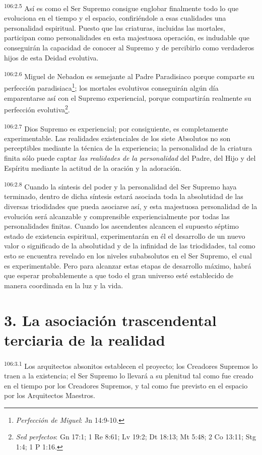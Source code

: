 \documentclass[twoside, 11pt]{book}
\begin{document}
\par
\textsuperscript{106:2.5} Así es como el Ser Supremo consigue englobar finalmente todo lo que evoluciona en el tiempo y el espacio, confiriéndole a esas cualidades una personalidad espiritual. Puesto que las criaturas, incluidas las mortales, participan como personalidades en esta majestuosa operación, es indudable que conseguirán la capacidad de conocer al Supremo y de percibirlo como verdaderos hijos de esta Deidad evolutiva.

\par
\textsuperscript{106:2.6} Miguel de Nebadon es semejante al Padre Paradisiaco porque comparte su perfección paradisiaca\footnote{\textit{Perfección de Miguel}: Jn 14:9-10.}; los mortales evolutivos conseguirán algún día emparentarse así con el Supremo experiencial, porque compartirán realmente su perfección evolutiva\footnote{\textit{Sed perfectos}: Gn 17:1; 1 Re 8:61; Lv 19:2; Dt 18:13; Mt 5:48; 2 Co 13:11; Stg 1:4; 1 P 1:16.}.

\par
\textsuperscript{106:2.7} Dios Supremo es experiencial; por consiguiente, es completamente experimentable. Las realidades existenciales de los siete Absolutos no son perceptibles mediante la técnica de la experiencia; la personalidad de la criatura finita sólo puede captar \textit{las realidades de la personalidad} del Padre, del Hijo y del Espíritu mediante la actitud de la oración y la adoración.

\par
\textsuperscript{106:2.8} Cuando la síntesis del poder y la personalidad del Ser Supremo haya terminado, dentro de dicha síntesis estará asociada toda la absolutidad de las diversas triodidades que pueda asociarse así, y esta majestuosa personalidad de la evolución será alcanzable y comprensible experiencialmente por todas las personalidades finitas. Cuando los ascendentes alcancen el supuesto séptimo estado de existencia espiritual, experimentarán en él el desarrollo de un nuevo valor o significado de la absolutidad y de la infinidad de las triodidades, tal como esto se encuentra revelado en los niveles subabsolutos en el Ser Supremo, el cual es experimentable. Pero para alcanzar estas etapas de desarrollo máximo, habrá que esperar probablemente a que todo el gran universo esté establecido de manera coordinada en la luz y la vida.

\section*{3. La asociación trascendental terciaria de la realidad}
\par
\textsuperscript{106:3.1} Los arquitectos absonitos establecen el proyecto; los Creadores Supremos lo traen a la existencia; el Ser Supremo lo llevará a su plenitud tal como fue creado en el tiempo por los Creadores Supremos, y tal como fue previsto en el espacio por los Arquitectos Maestros.
\end{document}
